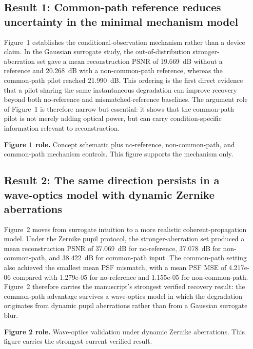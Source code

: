 \documentclass[11pt]{article}
\begin{document}
\subsection{Result 1: Common-path reference reduces uncertainty in the minimal mechanism model}
Figure~1 establishes the conditional-observation mechanism rather than a device claim. In the Gaussian surrogate study, the out-of-distribution stronger-aberration set gave a mean reconstruction PSNR of 19.669~dB without a reference and 20.268~dB with a non-common-path reference, whereas the common-path pilot reached 21.990~dB. This ordering is the first direct evidence that a pilot sharing the same instantaneous degradation can improve recovery beyond both no-reference and mismatched-reference baselines. The argument role of Figure~1 is therefore narrow but essential: it shows that the common-path pilot is not merely adding optical power, but can carry condition-specific information relevant to reconstruction.

\textbf{Figure 1 role.} Concept schematic plus no-reference, non-common-path, and common-path mechanism controls. This figure supports the mechanism only.

\subsection{Result 2: The same direction persists in a wave-optics model with dynamic Zernike aberrations}
Figure~2 moves from surrogate intuition to a more realistic coherent-propagation model. Under the Zernike pupil protocol, the stronger-aberration set produced a mean reconstruction PSNR of 37.069~dB for no-reference, 37.078~dB for non-common-path, and 38.422~dB for common-path input. The common-path setting also achieved the smallest mean PSF mismatch, with a mean PSF MSE of 4.217e-06 compared with 1.279e-05 for no-reference and 1.155e-05 for non-common-path. Figure~2 therefore carries the manuscript's strongest verified recovery result: the common-path advantage survives a wave-optics model in which the degradation originates from dynamic pupil aberrations rather than from a Gaussian surrogate blur.

\textbf{Figure 2 role.} Wave-optics validation under dynamic Zernike aberrations. This figure carries the strongest current verified result.
\end{document}
